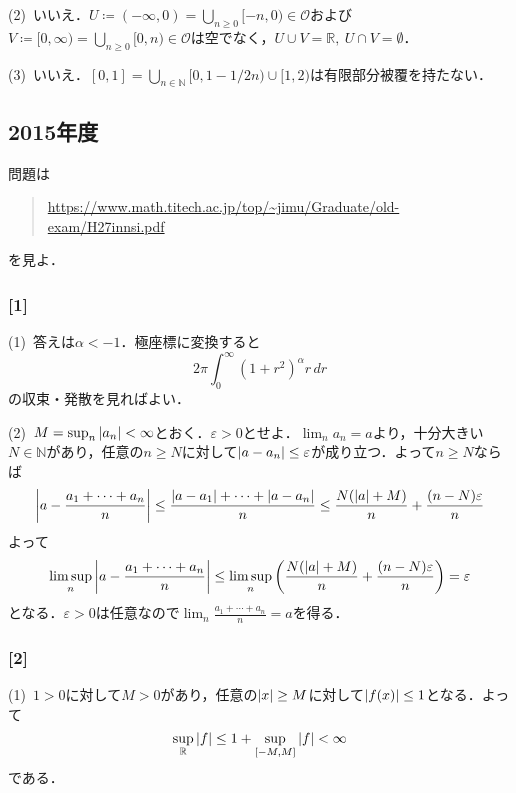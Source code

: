 \documentclass[a4j]{ltjsarticle}
\newcommand{\Rset}{\mathbb{R}}
\newcommand{\Nset}{\mathbb{N}}
\newcommand{\1}{\mathbbm{1}}
\numberwithin{equation}{section}
\theoremstyle{definition}
\begin{document}
(2)\ いいえ．$U\coloneq(-\infty,0)=\bigcup_{n\geq0}[-n,0)\in\mathcal{O}$および$V\coloneq [0,\infty)=\bigcup_{n\geq0}[0,n)\in\mathcal{O}$は空でなく，$U\cup V=\Rset,\ U\cap V=\emptyset$．

(3)\ いいえ．$[0,1]=\bigcup_{n\in\Nset}[0,1-1/2n)\cup [1,2)$は有限部分被覆を持たない．
\subsection{2015年度}
問題は
\begin{quote}
    \url{https://www.math.titech.ac.jp/top/~jimu/Graduate/old-exam/H27innsi.pdf}
\end{quote}
を見よ．
\subsubsection*{[1]}
(1)\ 答えは$\alpha<-1$．極座標に変換すると
\begin{equation}
    2\pi\int_0^\infty (1+r^2)^\alpha r\,dr 
\end{equation}
の収束・発散を見ればよい．

(2)\ $M=\sup_{n}\abs{a_n}<\infty$とおく．$\varepsilon>0$とせよ．$\lim_{n}a_n=a$より，十分大きい$N\in\Nset$があり，任意の$n\geq N$に対して$\abs{a-a_n}\leq \varepsilon$が成り立つ．よって$n\geq N$ならば
\begin{equation}
    \abs{a-\frac{a_1+\cdots+a_n}{n}}\leq \frac{\abs{a-a_1}+\cdots+\abs{a-a_n}}{n}\leq \frac{N(\abs{a}+M)}{n}+\frac{(n-N)\varepsilon}{n}
\end{equation}
よって
\begin{equation}
    \limsup_{n}\abs{a-\frac{a_1+\cdots+a_n}{n}}\leq \limsup_{n}\qty(\frac{N(\abs{a}+M)}{n}+\frac{(n-N)\varepsilon}{n})=\varepsilon
\end{equation}
となる．$\varepsilon>0$は任意なので$\lim_{n}\frac{a_1+\cdots+a_n}{n}=a$を得る．
\subsubsection*{[2]}
(1)\ $1>0$に対して$M>0$があり，任意の$\abs{x}\geq M$に対して$\abs{f(x)}\leq 1$となる．よって
\begin{equation}
    \sup_{\Rset}\abs{f}\leq 1+\sup_{[-M,M]}\abs{f}<\infty 
\end{equation}
である．
\end{document}
